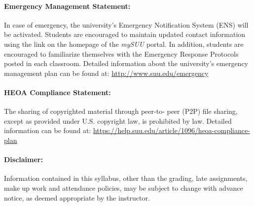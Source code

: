 \documentclass[12pt, letterpaper]{article}
\begin{document}
\paragraph{Emergency Management Statement:}
In case of emergency, the university's Emergency Notification System (ENS) will be activated. Students are encouraged to maintain updated contact information using the link on the homepage of the \emph{mySUU} portal. In addition, students are encouraged to familiarize themselves with the Emergency Response Protocols posted in each classroom. Detailed information about the university's emergency management plan can be found at: \href{http://www.suu.edu/emergency}{http://www.suu.edu/emergency}

\paragraph{HEOA Compliance Statement:}
The sharing of copyrighted material through peer-to- peer (P2P) file sharing, except as provided under U.S. copyright law, is prohibited by law. Detailed information can be found at: \href{https://help.suu.edu/article/1096/heoa-compliance-plan}{https://help.suu.edu/article/1096/heoa-compliance-plan}

\paragraph{Disclaimer:}
Information contained in this syllabus, other than the grading, late assignments, make up work and attendance policies, may be subject to change with advance notice, as deemed appropriate by the instructor.
\end{document}
